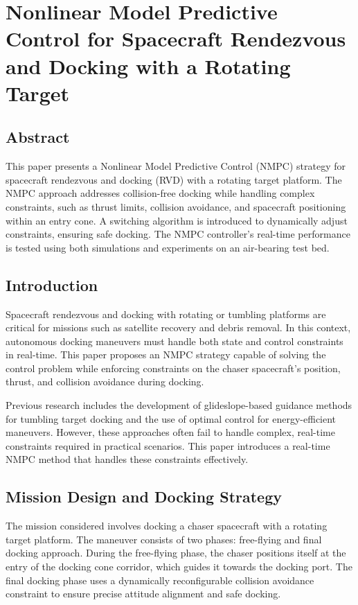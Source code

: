 \documentclass[a4paper,12pt]{article}
\begin{document}
\section{Nonlinear Model Predictive Control for Spacecraft Rendezvous and Docking with a Rotating Target}
\subsection{Abstract}
This paper presents a Nonlinear Model Predictive Control (NMPC) strategy for spacecraft rendezvous and docking (RVD) with a rotating target platform. The NMPC approach addresses collision-free docking while handling complex constraints, such as thrust limits, collision avoidance, and spacecraft positioning within an entry cone. A switching algorithm is introduced to dynamically adjust constraints, ensuring safe docking. The NMPC controller's real-time performance is tested using both simulations and experiments on an air-bearing test bed.

\subsection{Introduction}
Spacecraft rendezvous and docking with rotating or tumbling platforms are critical for missions such as satellite recovery and debris removal. In this context, autonomous docking maneuvers must handle both state and control constraints in real-time. This paper proposes an NMPC strategy capable of solving the control problem while enforcing constraints on the chaser spacecraft's position, thrust, and collision avoidance during docking.

Previous research includes the development of glideslope-based guidance methods for tumbling target docking and the use of optimal control for energy-efficient maneuvers. However, these approaches often fail to handle complex, real-time constraints required in practical scenarios. This paper introduces a real-time NMPC method that handles these constraints effectively.

\subsection{Mission Design and Docking Strategy}
The mission considered involves docking a chaser spacecraft with a rotating target platform. The maneuver consists of two phases: free-flying and final docking approach. During the free-flying phase, the chaser positions itself at the entry of the docking cone corridor, which guides it towards the docking port. The final docking phase uses a dynamically reconfigurable collision avoidance constraint to ensure precise attitude alignment and safe docking.
\end{document}

